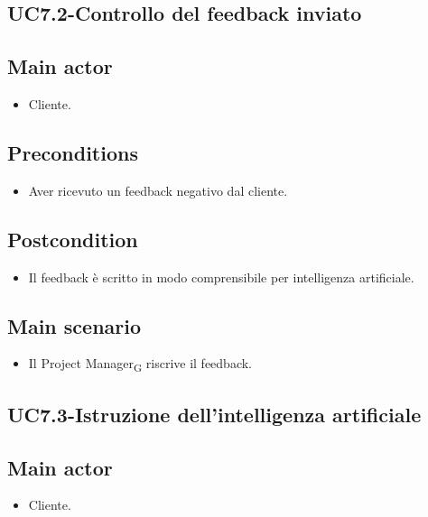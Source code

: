\documentclass{article}
\begin{document}
\subsection{UC7.2-Controllo del feedback inviato}
    
     \subsection*{Main actor}
         \begin{itemize}
             \item Cliente.
         \end{itemize}
     \subsection*{Preconditions} 
        \begin{itemize}
            \item Aver ricevuto un feedback negativo dal cliente.
        \end{itemize}
        \subsection*{Postcondition} 
        \begin{itemize}
            \item Il feedback è scritto in modo comprensibile per intelligenza artificiale.
        \end{itemize}
        \subsection*{Main scenario}
        \begin{itemize}
            \item Il Project Manager\textsubscript{G} riscrive il feedback.
        \end{itemize}

    \subsection{UC7.3-Istruzione dell'intelligenza artificiale}
     \subsection*{Main actor}
         \begin{itemize}
             \item Cliente.
         \end{itemize}
\end{document}

